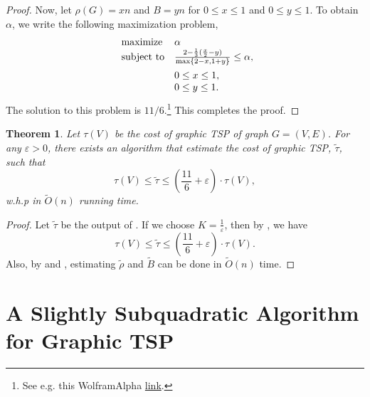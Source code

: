 \documentclass[letterpaper,11pt]{article}
\renewcommand{\epsilon}{\varepsilon}
\newcommand{\tspsize}[1]{\ensuremath{\tau}(#1)}
\newtheorem{theorem}{Theorem}[section]
\newenvironment{myproof}{
\vspace{-0.5cm}
\begin{proof}
}{
\end{proof}
}
\begin{document}
\begin{myproof}
Now, let $\rho(G) = xn$ and $B = yn$ for $0 \leq x \leq 1$ and $ 0\leq y \leq 1$. To obtain $\alpha$, we write the following maximization problem,
\begin{align*}
\begin{array}{ll@{}ll}
\text{maximize}  & \alpha \\
\vspace{5pt}\text{subject to}& \frac{2 - \frac{1}{3}(\frac{x}{2} - y)}{\max\{2-x, 1+y\}} \leq \alpha,\\
                & 0\leq x \leq 1,\\
                 & 0\leq y \leq 1.
\end{array}
\end{align*}
The solution to this problem is $11/6$.\footnote{See e.g. this WolframAlpha  \href{https://www.wolframalpha.com/input?i=Maximize\%5B\%282-1\%2F3*\%28x\%2F2+-+y\%29\%29+\%2F+Max\%5B2-x\%2C+1\%2By\%5D\%2C+\%7B0\%3C\%3D+x+\%3C\%3D1\%2C+0\%3C\%3Dy\%3C\%3D1\%7D\%2C+\%7Bx\%2Cy\%7D\%5D}{link}.} This completes the proof.
\end{myproof}



\begin{theorem}\label{thm: graphic-tsp2}
Let $\tspsize{V}$ be the cost of graphic TSP of graph $G = (V, E)$. For any $\epsilon > 0$, there exists an algorithm that estimate the cost of graphic TSP, $\tilde{\tau}$, such that
$$
\tspsize{V} \leq \tilde{\tau} \leq (\frac{11}{6} + \epsilon) \cdot \tspsize{V},
$$
w.h.p in $\tilde{O}(n)$ running time. \vspace{3pt}
\end{theorem}

\begin{myproof}
Let $\tilde{\tau}$ be the output of . If we choose $K = \frac{1}{\epsilon}$, then by , we have 
$$
\tspsize{V} \leq \tilde{\tau} \leq (\frac{11}{6} + \epsilon) \cdot \tspsize{V}.
$$
Also, by  and , estimating $\tilde{\rho}$ and $\tilde{B}$ can be done in $\tilde{O}(n)$ time.
\end{myproof}




\section{A Slightly Subquadratic Algorithm for Graphic TSP}\label{sec:graphic-TSP-slightly-sub}
\end{document}
